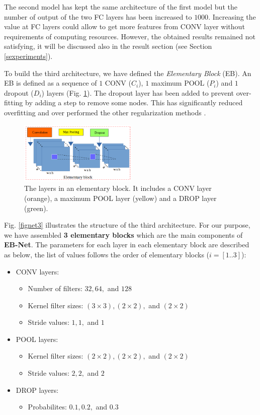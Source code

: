 \documentclass[review]{elsarticle}
\begin{document}
The second model has kept the same architecture of the first model but
the number of output of the two FC layers has been increased to
$1000$. Increasing the value at FC layers could allow to get more
features from CONV layer without requirements of computing
resources. However, the obtained results remained not satisfying, it
will be discussed also in the result section (see Section
\ref{sexperiments}).


To build the third architecture, we have defined the
\textit{Elementary Block} (EB). An EB is defined as a sequence of $1$
CONV ($C_{i}$), $1$ maximum POOL ($P_i$) and $1$ dropout ($D_i$)
layers (Fig. \ref{figelementary}). The dropout layer has been added to
prevent over-fitting by adding a step to remove some nodes. This has
significantly reduced overfitting and over performed the other
regularization methods \cite{srivastava2014dropout}.


\begin{figure}[h]
	\centering
	\includegraphics[width=0.5\textwidth]{images/elementary_block}
	\caption{The layers in an elementary block. It includes a CONV layer (orange), a maximum POOL layer (yellow) and a DROP layer (green).}
	\label{figelementary}
\end{figure}

Fig. \ref{fignet3} illustrates the structure of the third
architecture. For our purpose, we have assembled \textbf{3 elementary
  blocks} which are the main components of \textbf{EB-Net}. The
parameters for each layer in each elementary block are described as
below, the list of values follows the order of elementary blocks ($i =
[1..3]$):

\begin{itemize}
	\item CONV layers:
	\begin{itemize}
		\item Number of filters: $32, 64, $ and $128$
		\item Kernel filter sizes: $(3 \times 3), (2 \times 2), $ and $(2 \times 2)$
		\item Stride values: $1, 1, $ and $1$ 
	\end{itemize}
	\item POOL layers:
		\begin{itemize}
			\item Kernel filter sizes: $(2 \times 2), (2 \times 2), $ and $(2 \times 2)$
			\item Stride values: $2, 2, $ and $2$
		\end{itemize}
	\item DROP layers:
		\begin{itemize}
			\item Probabilites: $0.1, 0.2, $ and $0.3$
		\end{itemize}
\end{itemize}
\end{document}
